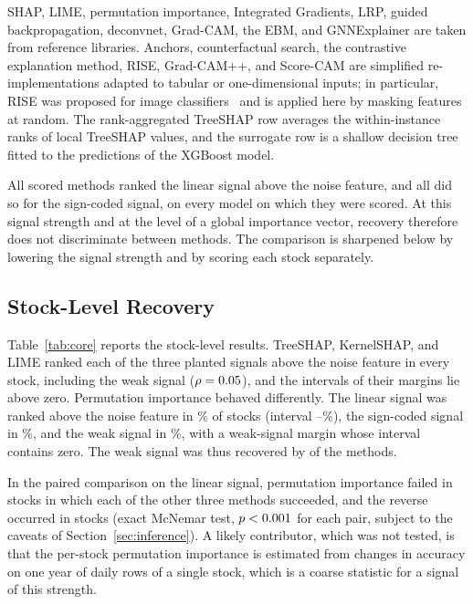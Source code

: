 \documentclass[conference]{IEEEtran}
\begin{document}
SHAP, LIME, permutation importance, Integrated Gradients, LRP, guided
backpropagation, deconvnet, Grad-CAM, the EBM, and GNNExplainer are taken
from reference libraries. Anchors, counterfactual search, the contrastive
explanation method, RISE, Grad-CAM++, and Score-CAM are simplified
re-implementations adapted to tabular or one-dimensional inputs; in
particular, RISE was proposed for image classifiers~\cite{petsiuk2018rise}
and is applied here by masking features at random. The rank-aggregated
TreeSHAP row averages the within-instance ranks of local TreeSHAP values,
and the surrogate row is a shallow decision tree fitted to the predictions
of the XGBoost model.

All \nXaiRecoveredLinear{} scored methods ranked the linear signal above the
noise feature, and all \nXaiRecoveredNl{} did so for the sign-coded signal,
on every model on which they were scored. At this signal strength and at the
level of a global importance vector, recovery therefore does not
discriminate between methods. The comparison is sharpened below by lowering
the signal strength and by scoring each stock separately.

\subsection{Stock-Level Recovery}
Table~\ref{tab:core} reports the stock-level results. TreeSHAP, KernelSHAP,
and LIME ranked each of the three planted signals above the noise feature in
every stock, including the weak signal ($\rho=0.05$), and the
intervals of their margins lie above zero. Permutation importance behaved
differently. The linear signal was ranked above the noise feature in
\pctSymPermutation\% of stocks (interval
\pctSymCiLoPermutation--\pctSymCiHiPermutation\%), the sign-coded signal in
\pctSymNlPermutation\%, and the weak signal in \pctSymWeakPermutation\%,
with a weak-signal margin whose interval contains zero. The weak signal was
thus recovered by \nWeakRecovered{} of the \nCoreMethods{} methods.

In the paired comparison on the linear signal, permutation importance failed
in \mcnemarPermOnlyWrong{} stocks in which each of the other three methods
succeeded, and the reverse occurred in \mcnemarOtherOnlyWrong{} stocks
(exact McNemar test, $p<0.001$ for each pair, subject to the caveats
of Section~\ref{sec:inference}). A likely contributor, which was not tested,
is that the per-stock permutation importance is estimated from changes in
accuracy on one year of daily rows of a single stock, which is a coarse
statistic for a signal of this strength.
\end{document}

